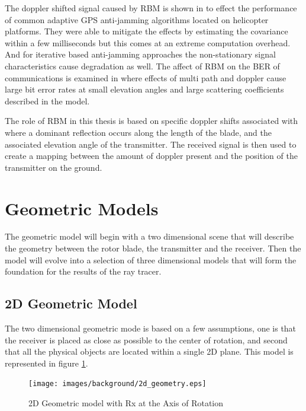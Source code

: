The doppler shifted signal caused by RBM is shown in \cite{F.BarbieroF.VincentT.Deloues2014} to effect the performance of common adaptive GPS anti-jamming algorithms located on helicopter platforms. They were able to mitigate the effects by estimating the covariance within a few milliseconds but this comes at an extreme computation overhead. And for iterative based anti-jamming approaches the non-stationary signal characteristics cause degradation as well. The affect of RBM on the BER of communications is examined in \cite{YiminZhang2000} where effects of multi path and doppler cause large bit error rates at small elevation angles and large scattering coefficients described in the model.

The role of RBM in this thesis is based on specific doppler shifts associated with where a dominant reflection occurs along the length of the blade, and the associated elevation angle of the transmitter. The received signal is then used to create a mapping between the amount of doppler present and the position of the transmitter on the ground.

\section{Geometric Models}
The geometric model will begin with a two dimensional scene that will describe the geometry between the rotor blade, the transmitter and the receiver. Then the model will evolve into a selection of three dimensional models that will form the foundation for the results of the ray tracer.

\subsection{2D Geometric Model}
The two dimensional geometric mode is based on a few assumptions, one is that the receiver is placed as close as possible to the center of rotation, and second that all the physical objects are located within a single 2D plane. This model is represented in figure \ref{fig:2D_model}.

\begin{figure}[h]
	\begin{center}
		\texttt{[image: images/background/2d\_geometry.eps]}
		\caption{2D Geometric model with Rx at the Axis of Rotation}
		\label{fig:2D_model}
	\end{center}
\end{figure}

